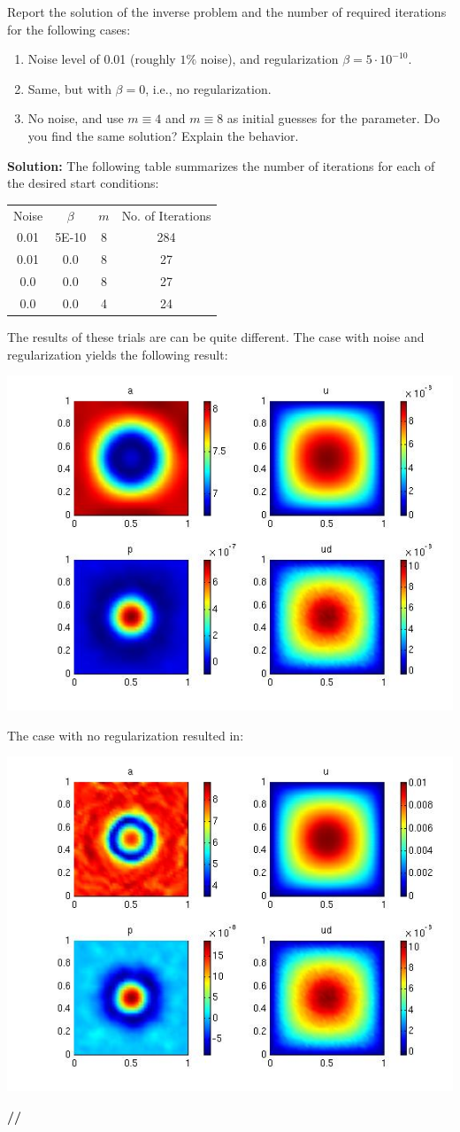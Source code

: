 \documentclass[11pt]{article}
\newenvironment{solution}{\begin{trivlist}\item[]{\bf Solution:}}
                      {\textbf{//} \end{trivlist}}
\begin{document}
\begin{enumerate}
\item[(a)] Report the solution of the inverse problem and the number of
	  required iterations for the following cases:



\begin{enumerate}
 \item[$\bullet$] Noise level of 0.01 (roughly $1\%$ noise), and
	      regularization $\beta = 5 \cdot 10^{-10}$.
 \item[$\bullet$] Same, but with $\beta = 0$, i.e., no regularization. 
 \item[$\bullet$] No noise, and use $m \equiv 4$ and $m \equiv 8$ as
	      initial guesses for the parameter. Do you find the same
	      solution? Explain the behavior.  
\end{enumerate}
\begin{solution}
The following table summarizes the number of iterations for each of the
 desired start conditions: 
\begin{center}
\begin{tabular}{| c | c | c | c |} \cline{1-4}
Noise & $\beta$ & $m$ & No. of Iterations \\ \cline{1-4}
0.01 & 5E-10 & 8 & 284 \\ \cline{1-4}
0.01 & 0.0 & 8 & 27 \\ \cline{1-4}
0.0 & 0.0 & 8 & 27 \\ \cline{1-4}
0.0 & 0.0 & 4 & 24 \\ \cline{1-4} 
\end{tabular} 
\end{center}
The results of these trials are can be quite different. The case with noise
 and regularization yields the following result: 
\begin{center}
\includegraphics[width = 6 cm]{figs/prob2aNoiseRegM8.jpg}
\end{center}

The case with no regularization resulted in:
\begin{center}
\includegraphics[width = 6 cm]{figs/prob2aNoiseNoRegM8.jpg}
\end{center}


\end{solution}
\end{enumerate}
\end{document}

